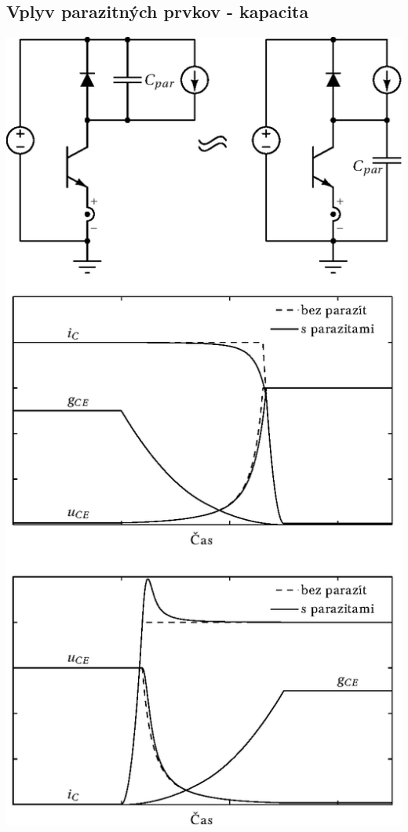 \documentclass[oneside]{article}
\begin{document}
\subsection{Vplyv parazitných prvkov - kapacita} \label{subsec:parazity}
{ \centering
\includegraphics[height=.85\textheight]{obr/Cpar_prekmit}
}
\end{document}

